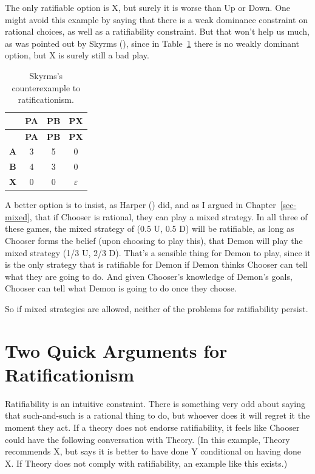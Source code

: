 \documentclass[
  12pt,
  letterpaper,
  DIV=11,
  numbers=noendperiod]{scrreprt}
\begin{document}
The only ratifiable option is X, but surely it is worse than Up or Down.
One might avoid this example by saying that there is a weak dominance
constraint on rational choices, as well as a ratifiability constraint.
But that won't help us much, as was pointed out by Skyrms
(), since in
Table~\ref{tbl-verybad-third} there is no weakly dominant option, but X
is surely still a bad play.

\begin{longtable}[]{@{}cccc@{}}
\caption{Skyrms's counterexample to
ratificationism.}\label{tbl-verybad-third}\tabularnewline
\toprule\noalign{}
& \textbf{PA} & \textbf{PB} & \textbf{PX} \\
\midrule\noalign{}
\endfirsthead
\toprule\noalign{}
& \textbf{PA} & \textbf{PB} & \textbf{PX} \\
\midrule\noalign{}
\endhead
\bottomrule\noalign{}
\endlastfoot
\textbf{A} & 3 & 5 & 0 \\
\textbf{B} & 4 & 3 & 0 \\
\textbf{X} & 0 & 0 & \(\varepsilon\) \\
\end{longtable}

A better option is to insist, as Harper
() did, and as I argued in
Chapter~\ref{sec-mixed}, that if Chooser is rational, they can play a
mixed strategy. In all three of these games, the mixed strategy of (0.5
U, 0.5 D) will be ratifiable, as long as Chooser forms the belief (upon
choosing to play this), that Demon will play the mixed strategy (1/3 U,
2/3 D). That's a sensible thing for Demon to play, since it is the only
strategy that is ratifiable for Demon if Demon thinks Chooser can tell
what they are going to do. And given Chooser's knowledge of Demon's
goals, Chooser can tell what Demon is going to do once they choose.

So if mixed strategies are allowed, neither of the problems for
ratifiability persist.

\section{Two Quick Arguments for
Ratificationism}\label{sec-ratify-two-quick}

Ratifiability is an intuitive constraint. There is something very odd
about saying that such-and-such is a rational thing to do, but whoever
does it will regret it the moment they act. If a theory does not endorse
ratifiability, it feels like Chooser could have the following
conversation with Theory. (In this example, Theory recommends X, but
says it is better to have done Y conditional on having done X. If Theory
does not comply with ratifiability, an example like this exists.)
\end{document}
